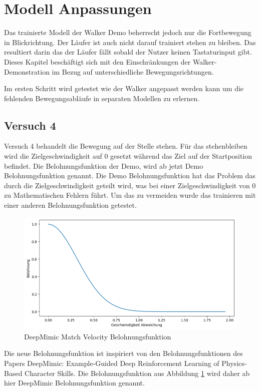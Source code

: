 \section{Modell Anpassungen}
Das trainierte Modell der Walker Demo beherrscht jedoch nur die Fortbewegung in Blickrichtung. Der Läufer ist auch nicht darauf trainiert stehen zu bleiben. Das resultiert darin das der Läufer fällt sobald der Nutzer keinen Tastaturinput gibt. Dieses Kapitel beschäftigt sich mit den Einschränkungen der Walker-Demonstration im Bezug auf unterschiedliche Bewegungsrichtungen.

Im ersten Schritt wird getestet wie der Walker angepasst werden kann um die fehlenden Bewegungsabläufe in separaten Modellen zu erlernen.

\subsection{Versuch 4}
Versuch 4 behandelt die Bewegung auf der Stelle stehen. Für das stehenbleiben wird die Zielgeschwindigkeit auf 0 gesetzt während das Ziel auf der Startposition befindet. Die Belohnungsfunktion der Demo, wird ab jetzt Demo Belohnungsfunktion genannt. Die Demo Belohnungsfunktion hat das Problem das durch die Zielgeschwindigkeit geteilt wird, was bei einer Zielgeschwindigkeit von 0 zu Mathematischen Fehlern führt. Um das zu vermeiden wurde das trainieren mit einer anderen Belohnungsfunktion getestet.
\begin{figure}[H]
  \centering  
  \includegraphics[scale=0.5]{img/match_velocity_exp.png}
  \caption{DeepMimic Match Velocity Belohnungsfunktion}
  \label{fig:match_velocity_exp}
\end{figure}
Die neue Belohnungsfunktion ist inspiriert von den Belohnungsfunktionen des Papers \grqq{}DeepMimic: Example-Guided Deep Reinforcement Learning of Physics-Based Character Skills\grqq{}.\cite{peng2018deepmimic}
Die Belohnungsfunktion aus Abbildung \ref{fig:match_velocity_exp} wird daher ab hier DeepMimic Belohnungsfunktion genannt.


